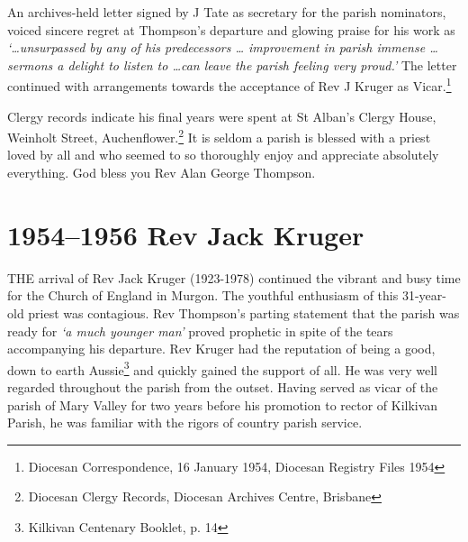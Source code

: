 An archives-held letter signed by J Tate as secretary for the parish nominators, voiced sincere regret at Thompson's departure and glowing praise for his work as \emph{`\ldots unsurpassed by any of his predecessors \ldots{} improvement in parish immense \ldots{} sermons a delight to listen to \ldots can leave the parish feeling very proud.'} The letter continued with arrangements towards the acceptance of Rev J Kruger as Vicar.\footnote{Diocesan Correspondence, 16 January 1954, Diocesan Registry Files 1954}


Clergy records indicate his final years were spent at St Alban's Clergy House, Weinholt Street, Auchenflower.\footnote{Diocesan Clergy Records, Diocesan Archives Centre, Brisbane} It is seldom a parish is blessed with a priest loved by all and who seemed to so thoroughly enjoy and appreciate absolutely everything. God bless you Rev Alan George Thompson.


\balance


\printendnotes[custom]
\setcounter{endnote}{0}
\chapter{1954--1956 Rev Jack Kruger}
\nobalance


\lettrine[lines=3]{T}{HE}
 arrival of Rev Jack Kruger (1923-1978) continued the vibrant and busy time for the Church of England in Murgon. The youthful enthusiasm of this 31-year-old priest was contagious. Rev Thompson's parting statement that the parish was ready for \emph{`a much younger man'} proved prophetic in spite of the tears accompanying his departure. Rev Kruger had the reputation of being a good, down to earth Aussie\footnote{Kilkivan Centenary Booklet, p. 14} and quickly gained the support of all. He was very well regarded throughout the parish from the outset. Having served as vicar of the parish of Mary Valley for two years before his promotion to rector of Kilkivan Parish, he was familiar with the rigors of country parish service.


